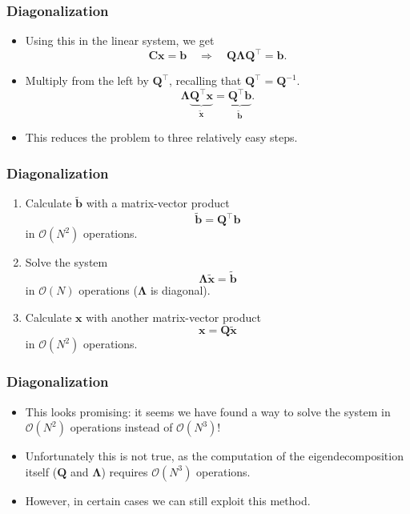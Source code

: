 \begin{frame}
  \frametitle{Diagonalization}
  \begin{itemize}
  \item Using this in the linear system, we get
    \[
      \bm C \bm x = \bm b \quad \Longrightarrow \quad
      \bm Q \bm \Lambda \bm Q^\intercal = \bm b.
    \]
  \item Multiply from the left by $\bm Q^\intercal$, recalling that
    $\bm Q^\intercal = \bm Q^{-1}$.
    \[
      \bm \Lambda \underbrace{\bm Q^\intercal \bm x}_{\tilde{\bm x}}
      = \underbrace{\bm Q^\intercal \bm b}_{\tilde{\bm b}}.
    \]
  \item This reduces the problem to three relatively easy steps.
  \end{itemize}
\end{frame}

\begin{frame}
  \frametitle{Diagonalization}
  \begin{enumerate}
  \item Calculate $\tilde{\bm b}$ with a matrix-vector product
    \[ \tilde{\bm b} = \bm Q^\intercal \bm b \]
    in $\mathcal{O}(N^2)$ operations.
  \item Solve the system
    \[ \bm \Lambda \tilde{\bm x} = \tilde{\bm b} \]
    in $\mathcal{O}(N)$ operations ($\bm \Lambda$ is diagonal).
  \item Calculate $\bm x$ with another matrix-vector product
    \[ \bm x = \bm Q \tilde{\bm x} \]
    in $\mathcal{O}(N^2)$ operations.
  \end{enumerate}
\end{frame}

\begin{frame}
  \frametitle{Diagonalization}
  \begin{itemize}
  \item This looks promising: it seems we have found a way to solve the system
    in $\mathcal{O}(N^2)$ operations instead of $\mathcal{O}(N^3)$!
  \item Unfortunately this is not true, as the computation of the
    eigendecomposition itself ($\bm Q$ and $\bm \Lambda$) requires
    $\mathcal{O}(N^3)$ operations.
  \item However, in certain cases we can still exploit this method.
  \end{itemize}
\end{frame}

